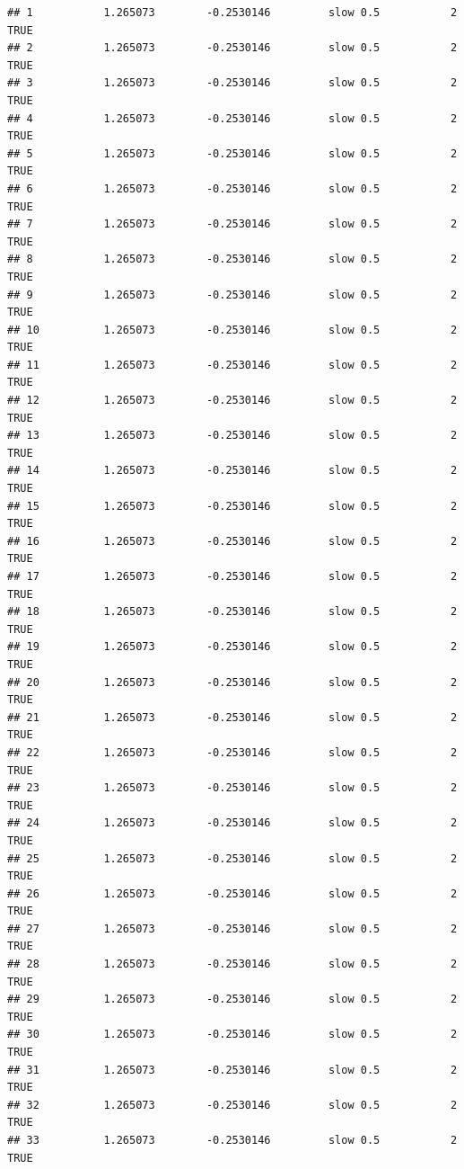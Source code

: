 \documentclass[
]{article}
\begin{document}
\begin{verbatim}
## 1           1.265073        -0.2530146         slow 0.5           2    TRUE
## 2           1.265073        -0.2530146         slow 0.5           2    TRUE
## 3           1.265073        -0.2530146         slow 0.5           2    TRUE
## 4           1.265073        -0.2530146         slow 0.5           2    TRUE
## 5           1.265073        -0.2530146         slow 0.5           2    TRUE
## 6           1.265073        -0.2530146         slow 0.5           2    TRUE
## 7           1.265073        -0.2530146         slow 0.5           2    TRUE
## 8           1.265073        -0.2530146         slow 0.5           2    TRUE
## 9           1.265073        -0.2530146         slow 0.5           2    TRUE
## 10          1.265073        -0.2530146         slow 0.5           2    TRUE
## 11          1.265073        -0.2530146         slow 0.5           2    TRUE
## 12          1.265073        -0.2530146         slow 0.5           2    TRUE
## 13          1.265073        -0.2530146         slow 0.5           2    TRUE
## 14          1.265073        -0.2530146         slow 0.5           2    TRUE
## 15          1.265073        -0.2530146         slow 0.5           2    TRUE
## 16          1.265073        -0.2530146         slow 0.5           2    TRUE
## 17          1.265073        -0.2530146         slow 0.5           2    TRUE
## 18          1.265073        -0.2530146         slow 0.5           2    TRUE
## 19          1.265073        -0.2530146         slow 0.5           2    TRUE
## 20          1.265073        -0.2530146         slow 0.5           2    TRUE
## 21          1.265073        -0.2530146         slow 0.5           2    TRUE
## 22          1.265073        -0.2530146         slow 0.5           2    TRUE
## 23          1.265073        -0.2530146         slow 0.5           2    TRUE
## 24          1.265073        -0.2530146         slow 0.5           2    TRUE
## 25          1.265073        -0.2530146         slow 0.5           2    TRUE
## 26          1.265073        -0.2530146         slow 0.5           2    TRUE
## 27          1.265073        -0.2530146         slow 0.5           2    TRUE
## 28          1.265073        -0.2530146         slow 0.5           2    TRUE
## 29          1.265073        -0.2530146         slow 0.5           2    TRUE
## 30          1.265073        -0.2530146         slow 0.5           2    TRUE
## 31          1.265073        -0.2530146         slow 0.5           2    TRUE
## 32          1.265073        -0.2530146         slow 0.5           2    TRUE
## 33          1.265073        -0.2530146         slow 0.5           2    TRUE

\end{verbatim}
\end{document}

